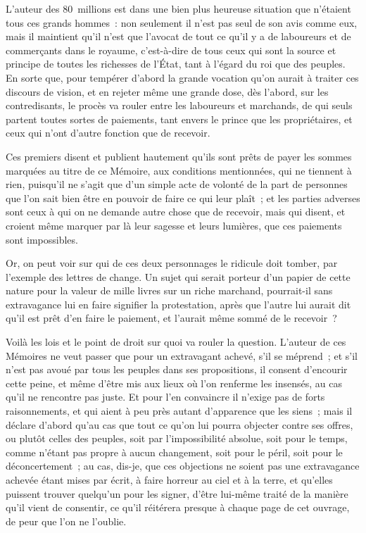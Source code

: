 \documentclass[french,twoside]{book} %
\begin{document}
L’auteur des 80 millions est dans une bien plus heureuse situation que n’étaient tous ces grands hommes : non seulement il n’est pas seul de son avis comme eux, mais il maintient qu’il n’est que l’avocat de tout ce qu’il y a de laboureurs et de commerçants dans le royaume, c’est-à-dire de tous ceux qui sont la source et principe de toutes les richesses de l’État, tant à l’égard du roi que des peuples. En sorte que, pour tempérer d’abord la grande vocation qu’on aurait à traiter ces discours de vision, et en rejeter même une grande dose, dès l’abord, sur les contredisants, le procès va rouler entre les laboureurs et marchands, de qui seuls partent toutes sortes de paiements, tant envers le prince que les propriétaires, et ceux qui n’ont d’autre fonction que de recevoir.\par
Ces premiers disent et publient hautement qu’ils sont prêts de payer les sommes marquées au titre de ce Mémoire, aux conditions mentionnées, qui ne tiennent à rien, puisqu’il ne s’agit que d’un simple acte de volonté de la part de personnes que l’on sait bien être en pouvoir de faire ce qui leur plaît ; et les parties adverses sont ceux à qui on ne demande autre chose que de recevoir, mais qui disent, et croient même marquer par là leur sagesse et leurs lumières, que ces paiements sont impossibles.\par
Or, on peut voir sur qui de ces deux personnages le ridicule doit tomber, par l’exemple des lettres de change. Un sujet qui serait porteur d’un papier de cette nature pour la valeur de mille livres sur un riche marchand, pourrait-il sans extravagance lui en faire signifier la protestation, après que l’autre lui aurait dit qu’il est prêt d’en faire le paiement, et l’aurait même sommé de le recevoir ?\par
Voilà les lois et le point de droit sur quoi va rouler la question. L’auteur de ces Mémoires ne veut passer que pour un extravagant achevé, s’il se méprend ; et s’il n’est pas avoué par tous les peuples dans ses propositions, il consent d’encourir cette peine, et même d’être mis aux lieux où l’on renferme les insensés, au cas qu’il ne rencontre pas juste. Et pour l’en convaincre il n’exige pas de forts raisonnements, et qui aient à peu près autant d’apparence que les siens ; mais il déclare d’abord qu’au cas que tout ce qu’on lui pourra objecter contre ses offres, ou plutôt celles des peuples, soit par l’impossibilité absolue, soit pour le temps, comme n’étant pas propre à aucun changement, soit pour le péril, soit pour le déconcertement ; au cas, dis-je, que ces objections ne soient pas une extravagance achevée étant mises par écrit, à faire horreur au ciel et à la terre, et qu’elles puissent trouver quelqu’un pour les signer, d’être lui-même traité de la manière qu’il vient de consentir, ce qu’il réitérera presque à chaque page de cet ouvrage, de peur que l’on ne l’oublie.\par
\end{document}
